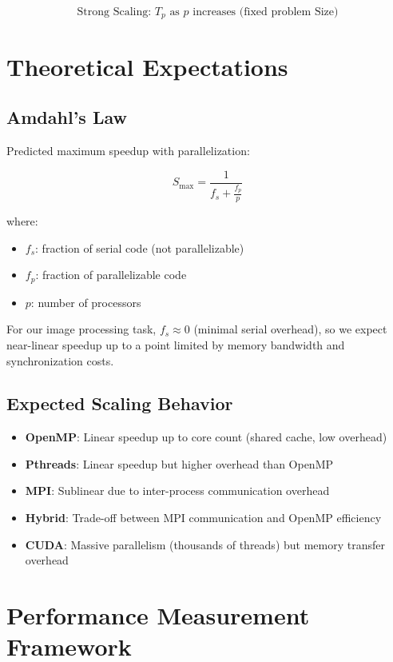 \documentclass[12pt,a4paper]{report}
\begin{document}
\begin{equation}
\text{Strong Scaling: } T_p \text{ as } p \text{ increases (fixed problem Size)}
\end{equation}

\section{Theoretical Expectations}

\subsection{Amdahl's Law}
Predicted maximum speedup with parallelization:

\begin{equation}
S_{\max} = \frac{1}{f_s + \frac{f_p}{p}}
\end{equation}

where:
\begin{itemize}
    \item $f_s$: fraction of serial code (not parallelizable)
    \item $f_p$: fraction of parallelizable code
    \item $p$: number of processors
\end{itemize}

For our image processing task, $f_s \approx 0$ (minimal serial overhead), so we expect near-linear speedup up to a point limited by memory bandwidth and synchronization costs.

\subsection{Expected Scaling Behavior}

\begin{itemize}
    \item \textbf{OpenMP}: Linear speedup up to core count (shared cache, low overhead)
    \item \textbf{Pthreads}: Linear speedup but higher overhead than OpenMP
    \item \textbf{MPI}: Sublinear due to inter-process communication overhead
    \item \textbf{Hybrid}: Trade-off between MPI communication and OpenMP efficiency
    \item \textbf{CUDA}: Massive parallelism (thousands of threads) but memory transfer overhead
\end{itemize}

\section{Performance Measurement Framework}
\end{document}
